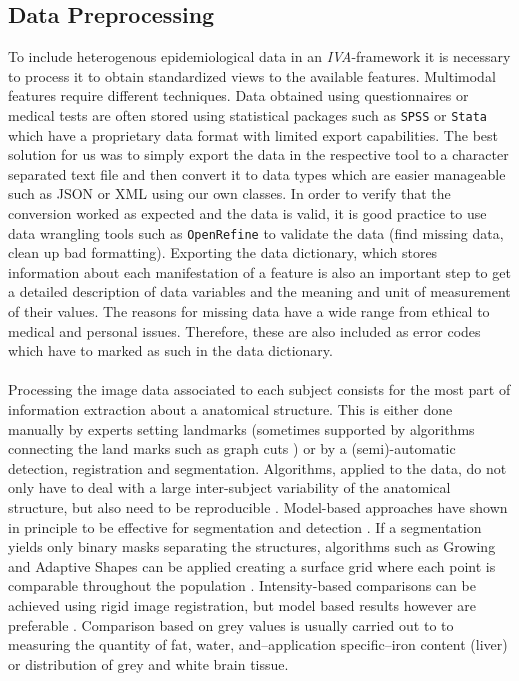 \documentclass[journal]{style/vgtc} 			          %
\begin{document}
\subsection{Data Preprocessing}
To include heterogenous epidemiological data in an \emph{IVA}-framework it is necessary to process it to obtain standardized views to the available features.
%
Multimodal features require different techniques.
%
Data obtained using questionnaires or medical tests are often stored using statistical packages such as \texttt{SPSS} or \texttt{Stata} which have a proprietary data format with limited export capabilities.
%
The best solution for us was to simply export the data in the respective tool to a character separated text file and then convert it to data types which are easier manageable such as JSON or XML using our own classes.
%
In order to verify that the conversion worked as expected and the data is valid, it is good practice to use data wrangling tools such as \texttt{OpenRefine} to validate the data (find missing data, clean up bad formatting).
%
Exporting the data dictionary, which stores information about each manifestation of a feature is also an important step to get a detailed description of data variables and the meaning and unit of measurement of their values.
%
The reasons for missing data have a wide range from ethical to medical and personal issues.
%
Therefore, these are also included as error codes which have to marked as such in the data dictionary.
\\\\
Processing the image data associated to each subject consists for the most part of information extraction about a anatomical structure.
%
This is either done manually by experts setting landmarks (sometimes supported by algorithms connecting the land marks such as graph cuts \cite{GraphCut}) or by a (semi)-automatic detection, registration and segmentation.
%
Algorithms, applied to the data, do not only have to deal with a large inter-subject variability of the anatomical structure, but also need to be reproducible \cite{Preim2014}.
%
Model-based approaches have shown in principle to be effective for segmentation \cite{Gloger2010, Gloger2012} and detection \cite{Rak2013}.
%
If a segmentation yields only binary masks separating the structures, algorithms such as Growing and Adaptive Shapes can be applied creating a surface grid where each point is comparable throughout the population \cite{Ferrarini2007}.
%
Intensity-based comparisons can be achieved using rigid image registration, but model based results however are preferable \cite{Klemm2012}.
%
Comparison based on grey values is usually carried out to to measuring the quantity of fat, water, and--application specific--iron content (liver) or distribution of grey and white brain tissue.
\end{document}
